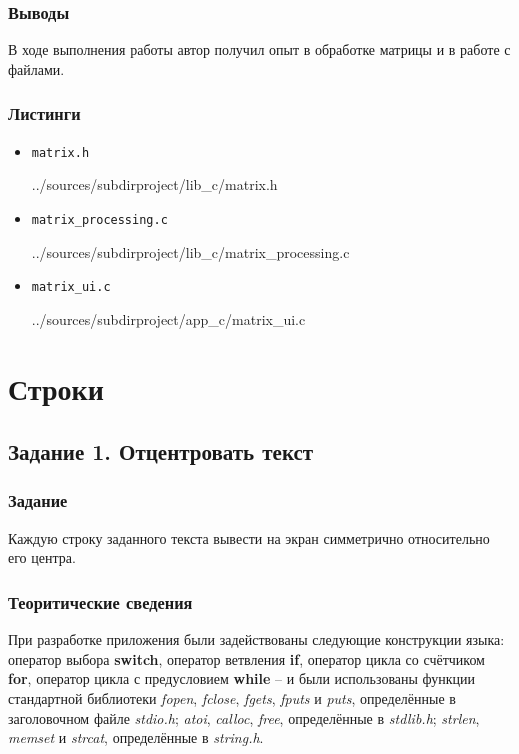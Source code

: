 \documentclass[12pt,a4paper]{report}
\begin{document}
\subsection{Выводы}
\hspace{\parindent}
В ходе выполнения работы автор получил опыт в обработке матрицы и в работе с файлами.
\subsection*{Листинги}
\begin{itemize}
\item[] \verb-matrix.h-

{../sources/subdirproject/lib_c/matrix.h}
\item[] \verb-matrix_processing.c-

{../sources/subdirproject/lib_c/matrix_processing.c}
\item[] \verb-matrix_ui.c-

{../sources/subdirproject/app_c/matrix_ui.c}
\end{itemize}


%
\chapter{Строки}
\section{Задание 1. Отцентровать текст}
\subsection{Задание}
\hspace{\parindent}
Каждую строку заданного текста вывести на экран симметрично относительно его центра.
\subsection{Теоритические сведения}
\hspace{\parindent}
При разработке приложения были задействованы следующие конструкции языка: оператор выбора \textbf{switch}, оператор ветвления \textbf{if}, оператор цикла со счётчиком \textbf{for}, оператор цикла с предусловием \textbf{while} -- и были использованы функции стандартной библиотеки \textit{fopen}, \textit{fclose}, \textit{fgets}, \textit{fputs} и \textit{puts}, определённые в заголовочном файле \textit{stdio.h}; \textit{atoi}, \textit{calloc}, \textit{free}, определённые в \textit{stdlib.h}; \textit{strlen}, \textit{memset} и \textit{strcat}, определённые в \textit{string.h}.
\end{document}
